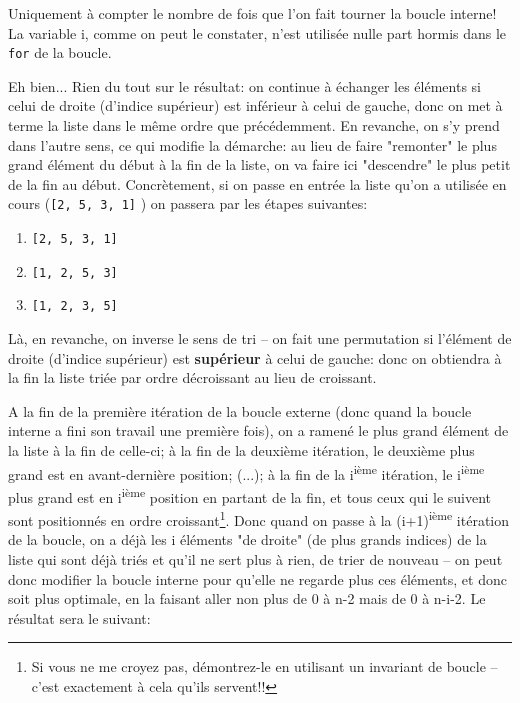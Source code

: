 \documentclass[12pt]{article}
\begin{document}
	\begin{MaReponse}
		\begin{alphenum}
			\item Uniquement à compter le nombre de fois que l'on fait tourner la boucle interne! La variable i, comme on peut le constater, n'est utilisée nulle part hormis dans le \texttt{for} de la boucle.
			\item Eh bien... Rien du tout sur le résultat: on continue à échanger les éléments si celui de droite (d'indice supérieur) est inférieur à celui de gauche, donc on met à terme la liste dans le même ordre que précédemment. En revanche, on s'y prend dans l'autre sens, ce qui modifie la démarche: au lieu de faire "remonter" le plus grand élément du début à la fin de la liste, on va faire ici "descendre" le plus petit de la fin au début. Concrètement, si on passe en entrée la liste qu'on a utilisée en cours (\texttt{[2, 5, 3, 1]} ) on passera par les étapes suivantes:
			\begin{enumerate}
				\item \texttt{[2, 5, 3, 1]}
				\item \texttt{[1, 2, 5, 3]}
				\item \texttt{[1, 2, 3, 5]}
			\end{enumerate}
			\item Là, en revanche, on inverse le sens de tri -- on fait une permutation si l'élément de droite (d'indice supérieur) est \textbf{supérieur} à celui de gauche: donc on obtiendra à la fin la liste triée par ordre décroissant au lieu de croissant.
			\item A la fin de la première itération de la boucle externe (donc quand la boucle interne a fini son travail une première fois), on a ramené le plus grand élément de la liste à la fin de celle-ci; à la fin de la deuxième itération, le deuxième plus grand est en avant-dernière position; (...); à la fin de la i\textsuperscript{ième} itération, le i\textsuperscript{ième} plus grand est en i\textsuperscript{ième} position en partant de la fin, et tous ceux qui le suivent sont positionnés en ordre croissant\footnote{Si vous ne me croyez pas, démontrez-le en utilisant un invariant de boucle -- c'est exactement à cela qu'ils servent!!}. Donc quand on passe à la (i+1)\textsuperscript{ième} itération de la boucle, on a déjà les i éléments "de droite" (de plus grands indices) de la liste qui sont déjà triés et qu'il ne sert plus à rien, de trier de nouveau --  on peut donc modifier la boucle interne pour qu'elle ne regarde plus ces éléments, et donc soit plus optimale, en la faisant aller non plus de 0 à n-2 mais de 0 à n-i-2. Le résultat sera le suivant:
		\end{alphenum}
	\end{MaReponse}
	
\end{document}

